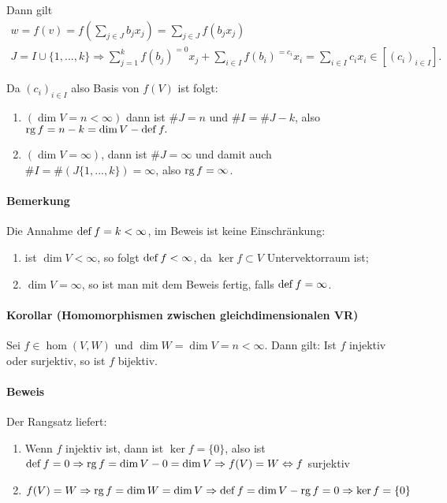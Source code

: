 	Dann gilt
	\begin{gather*}
		w = f(v) = f(\sum_{j\in J} b_jx_j) = \sum_{j\in J}f(b_jx_j)\\
		J=I \cup\{{1,...,k\}} \Rightarrow \sum_{j=1}^{k}f(b_j)^{=0}x_j + \sum_{i\in I}f(b_i)^{=c_i}x_i = \sum_{i\in I}c_ix_i\in[(c_i)_{i\in I}].
	\end{gather*}
			
	Da $(c_i)_{i\in I}$ also Basis von $f(V)$ ist folgt:
			
	\begin{enumerate}[1.{ Fall}]
		\item $(\dim V = n<\infty)$ dann ist $\# J = n$ und $\# I = \# J-k$, also $\operatorname{rg} f = n-k = \dim V - \operatorname{def} f.$
		\item $(\dim V = \infty)$, dann ist $\# J = \infty $ und damit auch $\#I =\#(J\{{1,...,k\}})=\infty $, also $\operatorname{rg} f= \infty$.
	\end{enumerate}
	
\paragraph{Bemerkung}
	Die Annahme $\operatorname{def} f = k<\infty$, im Beweis ist keine Einschränkung:
	\begin{enumerate}
		\item ist $\dim V < \infty$, so folgt $\operatorname{def} f<\infty$, da $\ker f\subset V$ Untervektorraum ist;			
		\item $\dim V = \infty$, so ist man mit dem Beweis fertig, falls $\operatorname{def} f = \infty$.
	\end{enumerate}
			
\paragraph{Korollar (Homomorphismen zwischen gleichdimensionalen VR)} 
	\begin{Korollar}
		Sei $f\in \hom(V,W)$ und $\dim W = \dim V = n<\infty$.
	Dann gilt: Ist $f$ injektiv oder surjektiv, so ist $f$ bijektiv.
	\end{Korollar}
	
\paragraph{Beweis} 
	Der Rangsatz liefert:
	\begin{enumerate}
		\item Wenn $ f $ injektiv ist, dann ist $\ker f = \{{0\}}$, also ist $ \operatorname{def} f = 0 \Rightarrow \operatorname{rg} f = \dim V-0 = \dim V \Rightarrow f(V) = W \Leftrightarrow f$ surjektiv
		\item $f(V) = W \Rightarrow \operatorname{rg} f = \dim W = \dim V \Rightarrow \operatorname{def} f= \dim V - \operatorname{rg} f=0 \Rightarrow \ker f = \{{0}\}$
	\end{enumerate}
	
